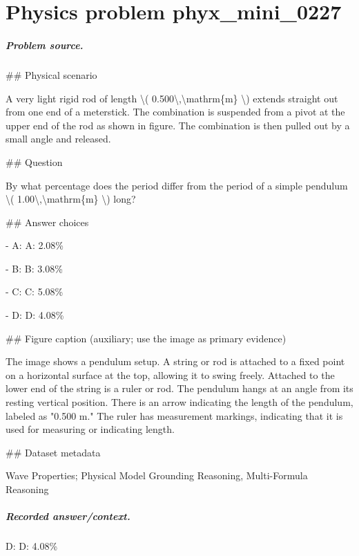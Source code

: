 
\chapter{Physics problem phyx\_mini\_0227}
\label{ch:PhyXMiniProblems_problem_phyx_mini_0227}

\paragraph{Problem source.}
\#\# Physical scenario

A very light rigid rod of length \textbackslash{}( 0.500\textbackslash{},\textbackslash{}mathrm\{m\} \textbackslash{}) extends straight out from one end of a meterstick. The combination is suspended from a pivot at the upper end of the rod as shown in figure. The combination is then pulled out by a small angle and released.

\#\# Question

By what percentage does the period differ from the period of a simple pendulum \textbackslash{}( 1.00\textbackslash{},\textbackslash{}mathrm\{m\} \textbackslash{}) long?

\#\# Answer choices

- A: A: 2.08\%

- B: B: 3.08\%

- C: C: 5.08\%

- D: D: 4.08\%

\#\# Figure caption (auxiliary; use the image as primary evidence)

The image shows a pendulum setup. A string or rod is attached to a fixed point on a horizontal surface at the top, allowing it to swing freely. Attached to the lower end of the string is a ruler or rod. The pendulum hangs at an angle from its resting vertical position. There is an arrow indicating the length of the pendulum, labeled as "0.500 m." The ruler has measurement markings, indicating that it is used for measuring or indicating length.

\#\# Dataset metadata

Wave Properties; Physical Model Grounding Reasoning, Multi-Formula Reasoning

\paragraph{Recorded answer/context.}
D: D: 4.08\%

